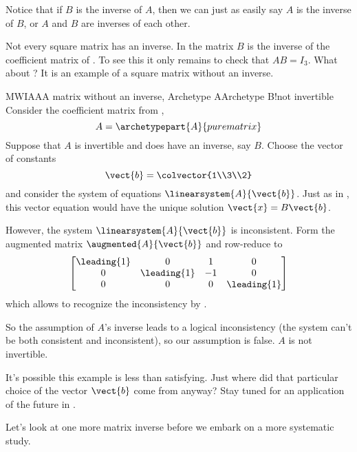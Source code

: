 %
Notice that if $B$ is the inverse of $A$, then we can just as easily say $A$ is the inverse of $B$, or $A$ and $B$ are inverses of each other.\par
%
Not every square matrix has an inverse.  In  the matrix $B$ is the inverse of the coefficient matrix of .  To see this it only remains to check that $AB=I_3$.  What about ?  It is an example of a square matrix without an inverse.
%
\begin{example}{MWIAA}{A matrix without an inverse, Archetype A}{Archetype B!not invertible}
Consider the coefficient matrix from ,
%
\begin{equation*}
A=\archetypepart{A}{purematrix}
\end{equation*}
%
Suppose that $A$ is invertible and does have an inverse, say $B$.  Choose the vector of constants
%
\begin{equation*}
\vect{b}=\colvector{1\\3\\2}
\end{equation*}
%
and consider the system of equations $\linearsystem{A}{\vect{b}}$.  Just as in , this vector equation would have the unique solution $\vect{x}=B\vect{b}$.\par
%
However, the system $\linearsystem{A}{\vect{b}}$ is inconsistent.  Form the augmented matrix $\augmented{A}{\vect{b}}$ and row-reduce to
%
\begin{equation*}
\begin{bmatrix}
\leading{1} & 0 & 1 & 0\\
0 & \leading{1} & -1 & 0\\
0 & 0 & 0 & \leading{1}
\end{bmatrix}
\end{equation*}
%
which allows to recognize the inconsistency by .\par
%
So the assumption of $A$'s inverse leads to a logical inconsistency (the system can't be both consistent and inconsistent), so our assumption is false.  $A$ is not invertible.\par
%
It's possible this example is less than satisfying.  Just where did that particular choice of the vector $\vect{b}$ come from anyway?  Stay tuned for an application of the future  in .
%
\end{example}
%
Let's look at one more matrix inverse before we embark on a more systematic study.
